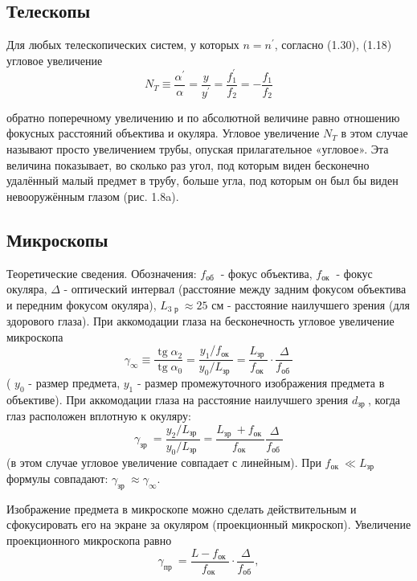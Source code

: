 \documentclass{astroedu-lab}
\begin{document}
\begin{problem}
\subsection*{Телескопы}

Для любых телескопических систем, у которых $n=n^{\prime}$, согласно (1.30), (1.18) угловое увеличение
$$
N_T \equiv \frac{\alpha^{\prime}}{\alpha}=\frac{y}{y^{\prime}}=\frac{f_1^{\prime}}{f_2}=-\frac{f_1}{f_2}
$$

обратно поперечному увеличению и по абсолютной величине равно отношению фокусных расстояний объектива и окуляра. Угловое увеличение $N_T$ в этом случае называют просто увеличением трубы, опуская прилагательное «угловое». Эта величина показывает, во сколько раз угол, под которым виден бесконечно удалённый малый предмет в трубу, больше угла, под которым он был бы виден невооружённым глазом (рис. 1.8a).

\subsection*{Микроскопы}

Теоретические сведения. Обозначения: $f_{\text {об }}$ - фокус объектива, $f_{\text {ок }}$ - фокус окуляра, $\Delta$ - оптический интервал (расстояние между задним фокусом объектива и передним фокусом окуляра), $L_{3 \text { р }} \approx 25$ см - расстояние наилучшего зрения (для здорового глаза).
При аккомодации глаза на бесконечность угловое увеличение микроскопа
$$
\gamma_{\infty} \equiv \frac{\operatorname{tg} \alpha_2}{\operatorname{tg} \alpha_0}=\frac{y_1 / f_{\text {ок }}}{y_0 / L_{\text {зр }}}=\frac{L_{\text {зр }}}{f_{\text {ок }}} \cdot \frac{\Delta}{f_{\text {об }}}
$$
( $y_0$ - размер предмета, $y_1$ - размер промежуточного изображения предмета в объективе).
При аккомодации глаза на расстояние наилучшего зрения $d_{\text {зр }}$, когда глаз расположен вплотную к окуляру:
$$
\gamma_{\text {зр }}=\frac{y_2 / L_{\text {зр }}}{y_0 / L_{\text {зр }}}=\frac{L_{\text {зр }}+f_{\text {ок }}}{f_{\text {ок }}} \frac{\Delta}{f_{\text {об }}}
$$
(в этом случае угловое увеличение совпадает с линейным). При $f_{\text {ок }} \ll L_{\text {зр }}$ формулы совпадают: $\gamma_{\text {зр }} \approx \gamma_{\infty}$.

Изображение предмета в микроскопе можно сделать действительным и сфокусировать его на экране за окуляром (проекционный микроскоп). Увеличение проекционного микроскопа равно
$$
\gamma_{\text {пр }}=\frac{L-f_{\text {ок }}}{f_{\text {ок }}} \cdot \frac{\Delta}{f_{\text {об }}},
$$


\end{problem}
\end{document}
